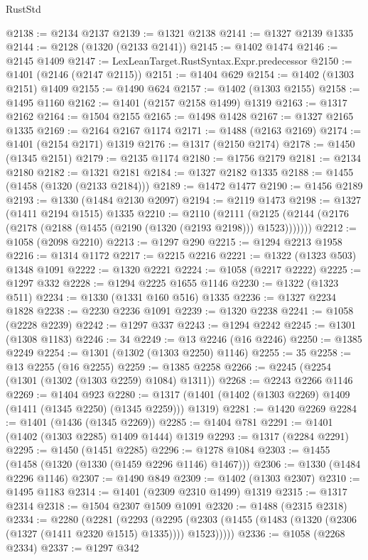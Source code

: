 \begin{lexlean}{RustStd}
\begin{coremodule}
@2138 := @2134 @2137
@2139 := @1321 @2138
@2141 := @1327 @2139 @1335
@2144 := @2128 (@1320 (@2133 @2141))
@2145 := @1402 @1474
@2146 := @2145 @1409
@2147 := LexLeanTarget.RustSyntax.Expr.predecessor
@2150 := @1401 (@2146 (@2147 @2115))
@2151 := @1404 @629
@2154 := @1402 (@1303 @2151) @1409
@2155 := @1490 @624
@2157 := @1402 (@1303 @2155)
@2158 := @1495 @1160
@2162 := @1401 (@2157 @2158 @1499) @1319
@2163 := @1317 @2162
@2164 := @1504 @2155
@2165 := @1498 @1428
@2167 := @1327 @2165 @1335
@2169 := @2164 @2167 @1174
@2171 := @1488 (@2163 @2169)
@2174 := @1401 (@2154 @2171) @1319
@2176 := @1317 (@2150 @2174)
@2178 := @1450 (@1345 @2151)
@2179 := @2135 @1174
@2180 := @1756 @2179
@2181 := @2134 @2180
@2182 := @1321 @2181
@2184 := @1327 @2182 @1335
@2188 := @1455 (@1458 (@1320 (@2133 @2184)))
@2189 := @1472 @1477
@2190 := @1456 @2189
@2193 := @1330 (@1484 @2130 @2097)
@2194 := @2119 @1473
@2198 := @1327 (@1411 @2194 @1515) @1335
@2210 := @2110
    (@2111 (@2125 (@2144 (@2176 (@2178 (@2188 (@1455 (@2190 (@1320 (@2193 @2198))) @1523)))))))
@2212 := @1058 (@2098 @2210)
@2213 := @1297 @290
@2215 := @1294 @2213 @1958
@2216 := @1314 @1172
@2217 := @2215 @2216
@2221 := @1322 (@1323 @503) @1348 @1091
@2222 := @1320 @2221
@2224 := @1058 (@2217 @2222)
@2225 := @1297 @332
@2228 := @1294 @2225 @1655 @1146
@2230 := @1322 (@1323 @511)
@2234 := @1330 (@1331 @160 @516) @1335
@2236 := @1327 @2234 @1828
@2238 := @2230 @2236 @1091
@2239 := @1320 @2238
@2241 := @1058 (@2228 @2239)
@2242 := @1297 @337
@2243 := @1294 @2242
@2245 := @1301 (@1308 @1183)
@2246 := 34
@2249 := @13 @2246 (@16 @2246)
@2250 := @1385 @2249
@2254 := @1301 (@1302 (@1303 @2250) @1146)
@2255 := 35
@2258 := @13 @2255 (@16 @2255)
@2259 := @1385 @2258
@2266 := @2245 (@2254 (@1301 (@1302 (@1303 @2259) @1084) @1311))
@2268 := @2243 @2266 @1146
@2269 := @1404 @923
@2280 := @1317 (@1401 (@1402 (@1303 @2269) @1409 (@1411 (@1345 @2250) (@1345 @2259))) @1319)
@2281 := @1420 @2269
@2284 := @1401 (@1436 (@1345 @2269))
@2285 := @1404 @781
@2291 := @1401 (@1402 (@1303 @2285) @1409 @1444) @1319
@2293 := @1317 (@2284 @2291)
@2295 := @1450 (@1451 @2285)
@2296 := @1278 @1084
@2303 := @1455 (@1458 (@1320 (@1330 (@1459 @2296 @1146) @1467)))
@2306 := @1330 (@1484 @2296 @1146)
@2307 := @1490 @849
@2309 := @1402 (@1303 @2307)
@2310 := @1495 @1183
@2314 := @1401 (@2309 @2310 @1499) @1319
@2315 := @1317 @2314
@2318 := @1504 @2307 @1509 @1091
@2320 := @1488 (@2315 @2318)
@2334 := @2280
    (@2281
      (@2293
        (@2295 (@2303 (@1455 (@1483 (@1320 (@2306 (@1327 (@1411 @2320 @1515) @1335)))) @1523)))))
@2336 := @1058 (@2268 @2334)
@2337 := @1297 @342

\end{coremodule}
\end{lexlean}
